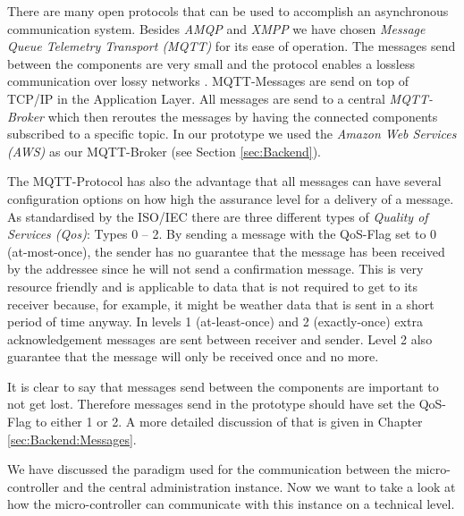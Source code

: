 There are many open protocols that can be used to accomplish an asynchronous communication system. Besides \textit{AMQP} and \textit{XMPP} we have chosen \textit{Message Queue Telemetry Transport (MQTT)} \cite{ISO:20922:2016} for its ease of operation. The messages send between the components are very small and the protocol enables a lossless communication over lossy networks \cite{Adryan:TechFound-Network:2017}. MQTT-Messages are send on top of TCP/IP in the Application Layer. All messages are send to a central \textit{MQTT-Broker} which then reroutes the messages by having the connected components subscribed to a specific topic. In our prototype we used the \textit{Amazon Web Services (AWS)} as our MQTT-Broker (see Section \ref{sec:Backend}).

The MQTT-Protocol has also the advantage that all messages can have several configuration options on how high the assurance level for a delivery of a message. As standardised by the ISO/IEC \cite{ISO:20922:2016} there are three different types of \textit{Quality of Services (Qos)}: Types 0 -- 2. By sending a message with the QoS-Flag set to 0 (at-most-once), the sender has no guarantee that the message has been received by the addressee since he will not send a confirmation message. This is very resource friendly and is applicable to data that is not required to get to its receiver because, for example, it might be weather data that is sent in a short period of time anyway. In levels 1 (at-least-once) and 2 (exactly-once) extra acknowledgement messages are sent between receiver and sender. Level 2 also guarantee that the message will only be received once and no more.

It is clear to say that messages send between the components are important to not get lost. Therefore messages send in the prototype should have set the QoS-Flag to either 1 or 2. A more detailed discussion of that is given in Chapter \ref{sec:Backend:Messages}.


We have discussed the paradigm used for the communication between the micro-controller and the central administration instance. Now we want to take a look at how the micro-controller can communicate with this instance on a technical level.

